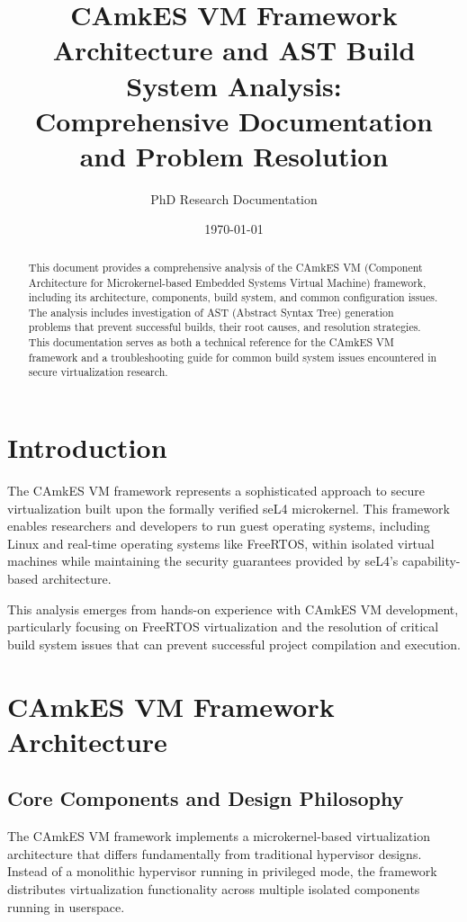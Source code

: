 \documentclass[11pt,a4paper]{article}
\title{CAmkES VM Framework Architecture and AST Build System Analysis: \\
Comprehensive Documentation and Problem Resolution}
\author{PhD Research Documentation}
\date{\today}
\begin{document}
\maketitle

\begin{abstract}
This document provides a comprehensive analysis of the CAmkES VM (Component Architecture for Microkernel-based Embedded Systems Virtual Machine) framework, including its architecture, components, build system, and common configuration issues. The analysis includes investigation of AST (Abstract Syntax Tree) generation problems that prevent successful builds, their root causes, and resolution strategies. This documentation serves as both a technical reference for the CAmkES VM framework and a troubleshooting guide for common build system issues encountered in secure virtualization research.
\end{abstract}

\tableofcontents
\newpage

\section{Introduction}

The CAmkES VM framework represents a sophisticated approach to secure virtualization built upon the formally verified seL4 microkernel. This framework enables researchers and developers to run guest operating systems, including Linux and real-time operating systems like FreeRTOS, within isolated virtual machines while maintaining the security guarantees provided by seL4's capability-based architecture.

This analysis emerges from hands-on experience with CAmkES VM development, particularly focusing on FreeRTOS virtualization and the resolution of critical build system issues that can prevent successful project compilation and execution.

\section{CAmkES VM Framework Architecture}

\subsection{Core Components and Design Philosophy}

The CAmkES VM framework implements a microkernel-based virtualization architecture that differs fundamentally from traditional hypervisor designs. Instead of a monolithic hypervisor running in privileged mode, the framework distributes virtualization functionality across multiple isolated components running in userspace.
\end{document}
